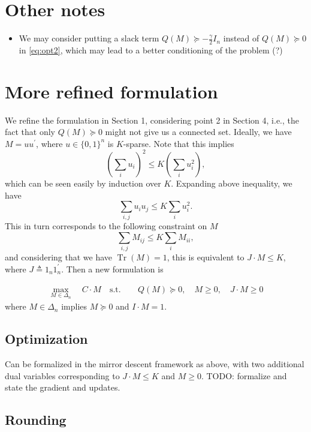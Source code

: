\documentclass{article}
\DeclareMathOperator{\Tr}{Tr}
\begin{document}
\section{Other notes}

\begin{itemize}
\item We may consider putting a slack term $Q(M) \succeq -\frac{\gamma}{2} I_n$ instead of $Q(M) \succeq 0$ in \eqref{eq:opt2}, which may lead to a better conditioning of the problem (?)
\end{itemize}



\section{More refined formulation}

We refine the formulation in Section 1, considering point 2 in Section 4, i.e., the fact that only $Q(M) \succeq 0$ might not give us a connected set. Ideally, we have $M = u u^\prime$, where $u \in \{0,1\}^n$ is $K$-sparse. Note that this implies
\[ \left( \sum_i u_i \right)^2 \leq K \left( \sum_i u_i^2 \right), \]
which can be seen easily by induction over $K$. Expanding above inequality, we have
\[ \sum_{i,j} u_i u_j \leq K \sum_i u_i^2. \]
This in turn corresponds to the following constraint on $M$
\[ \sum_{i,j} M_{ij} \leq K \sum_i M_{ii}, \]
and considering that we have $\Tr(M) = 1$, this is equivalent to $J \cdot M \leq K$, where $J \triangleq 1_n 1_n^\prime$. Then a new formulation is

\begin{align*}
  \max_{M \in \Delta_n} \quad C \cdot M \quad \mathrm{s.t.\ } \quad & Q(M) \succeq 0, \quad M \geq 0, \quad J \cdot M \geq 0
\end{align*}
where $M \in \Delta_n$ implies $M \succeq 0$ and $I \cdot M = 1$.

\subsection{Optimization}

Can be formalized in the mirror descent framework as above, with two additional dual variables corresponding to $J \cdot M \leq K$ and $M \geq 0$. TODO: formalize and state the gradient and updates.

\subsection{Rounding}
\end{document}
